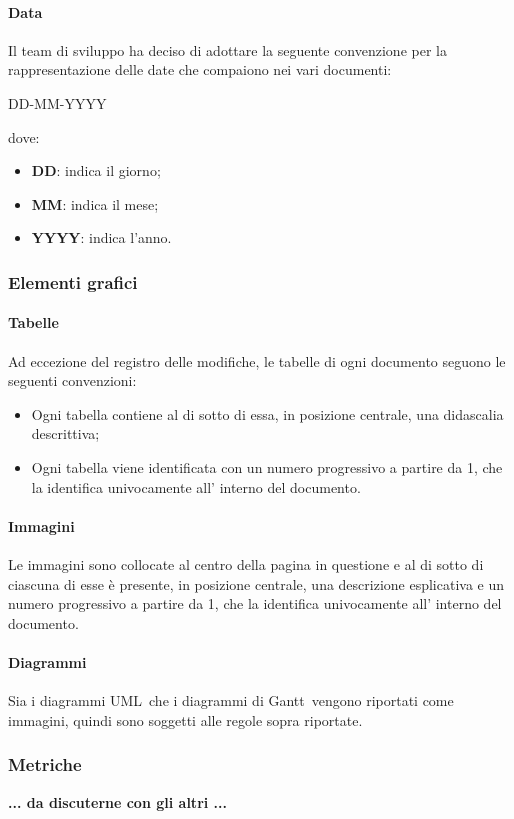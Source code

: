 \paragraph{Data}
Il team di sviluppo ha deciso di adottare la seguente convenzione per la rappresentazione delle date che compaiono nei vari documenti:
\begin{center}
    \large{DD-MM-YYYY}
\end{center}
dove:
\begin{itemize}
    \item \textbf{DD}: indica il giorno;
    \item \textbf{MM}: indica il mese;
    \item \textbf{YYYY}: indica l'anno.
\end{itemize}

\subsubsection{Elementi grafici}
\paragraph{Tabelle}
Ad eccezione del registro delle modifiche, le tabelle di ogni documento seguono le seguenti convenzioni:
\begin{itemize}
    \item Ogni tabella contiene al di sotto di essa, in posizione centrale, una didascalia descrittiva;
    \item Ogni tabella viene identificata con un numero progressivo a partire da 1, che la identifica univocamente all' interno del documento.
\end{itemize}
\paragraph{Immagini}
Le immagini sono collocate al centro della pagina in questione e al di sotto di ciascuna di esse è presente, in posizione centrale, una descrizione esplicativa e un numero progressivo a partire da 1, che la identifica univocamente all' interno del documento.
\paragraph{Diagrammi}
Sia i diagrammi UML\glo\ che i diagrammi di Gantt\glo\ vengono riportati come immagini, quindi sono soggetti alle regole sopra riportate.
\subsubsection{Metriche}
\textbf{... da discuterne con gli altri ...}
